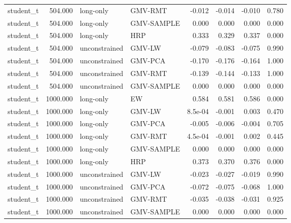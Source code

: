 \begin{table}[t]
{\begin{tabular}{lrllrrrr}
student\_t & 504.000 & long-only & GMV-RMT & -0.012 & -0.014 & -0.010 & 0.780 \\
student\_t & 504.000 & long-only & GMV-SAMPLE & 0.000 & 0.000 & 0.000 & 0.000 \\
student\_t & 504.000 & long-only & HRP & 0.333 & 0.329 & 0.337 & 0.000 \\
student\_t & 504.000 & unconstrained & GMV-LW & -0.079 & -0.083 & -0.075 & 0.990 \\
student\_t & 504.000 & unconstrained & GMV-PCA & -0.170 & -0.176 & -0.164 & 1.000 \\
student\_t & 504.000 & unconstrained & GMV-RMT & -0.139 & -0.144 & -0.133 & 1.000 \\
student\_t & 504.000 & unconstrained & GMV-SAMPLE & 0.000 & 0.000 & 0.000 & 0.000 \\
student\_t & 1000.000 & long-only & EW & 0.584 & 0.581 & 0.586 & 0.000 \\
student\_t & 1000.000 & long-only & GMV-LW & 8.5e-04 & -0.001 & 0.003 & 0.470 \\
student\_t & 1000.000 & long-only & GMV-PCA & -0.005 & -0.006 & -0.004 & 0.705 \\
student\_t & 1000.000 & long-only & GMV-RMT & 4.5e-04 & -0.001 & 0.002 & 0.445 \\
student\_t & 1000.000 & long-only & GMV-SAMPLE & 0.000 & 0.000 & 0.000 & 0.000 \\
student\_t & 1000.000 & long-only & HRP & 0.373 & 0.370 & 0.376 & 0.000 \\
student\_t & 1000.000 & unconstrained & GMV-LW & -0.023 & -0.027 & -0.019 & 0.990 \\
student\_t & 1000.000 & unconstrained & GMV-PCA & -0.072 & -0.075 & -0.068 & 1.000 \\
student\_t & 1000.000 & unconstrained & GMV-RMT & -0.035 & -0.038 & -0.031 & 0.925 \\
student\_t & 1000.000 & unconstrained & GMV-SAMPLE & 0.000 & 0.000 & 0.000 & 0.000 \\
\bottomrule
\end{tabular}}
\end{table}
